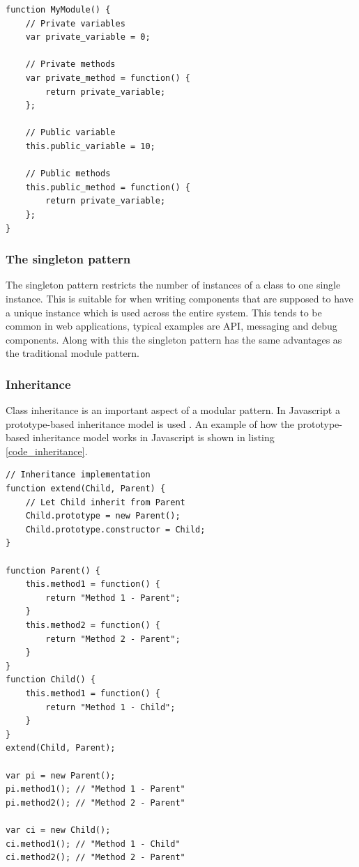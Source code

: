 \lstset{frame=single, caption=A simple example of how to implement a module in Javascript using the function literal notation., label=code_module_example, captionpos=b, tabsize=2}
\begin{framed}
\begin{lstlisting}
function MyModule() {
	// Private variables
	var private_variable = 0;

	// Private methods
	var private_method = function() {
		return private_variable;
	};

	// Public variable
	this.public_variable = 10;

	// Public methods
	this.public_method = function() {
		return private_variable;
	};
}
\end{lstlisting}
\end{framed}

\subsubsection{The singleton pattern}
The singleton pattern restricts the number of instances of a class to one single instance. This is suitable for when writing components that are supposed to have a unique instance which is used across the entire system. This tends to be common in web applications, typical examples are API, messaging and debug components. Along with this the singleton pattern has the same advantages as the traditional module pattern.

\subsubsection{Inheritance}
Class inheritance is an important aspect of a modular pattern. In Javascript a prototype-based inheritance model is used \cite[p. 199]{js_def_guide}. An example of how the prototype-based inheritance model works in Javascript is shown in listing \ref{code_inheritance}.

\lstset{frame=single, caption=Prototype-based inheritance in Javascript. Child inherits from Parent., label=code_inheritance, captionpos=b, tabsize=2}
\begin{framed}
\begin{lstlisting}
// Inheritance implementation
function extend(Child, Parent) {
	// Let Child inherit from Parent
	Child.prototype = new Parent();
	Child.prototype.constructor = Child;
}

function Parent() {
	this.method1 = function() {
		return "Method 1 - Parent";
	}
	this.method2 = function() {
		return "Method 2 - Parent";
	}
}
function Child() {
	this.method1 = function() {
		return "Method 1 - Child";
	}
}
extend(Child, Parent);

var pi = new Parent();
pi.method1(); // "Method 1 - Parent"
pi.method2(); // "Method 2 - Parent"

var ci = new Child();
ci.method1(); // "Method 1 - Child"
ci.method2(); // "Method 2 - Parent"
\end{lstlisting}
\end{framed}

